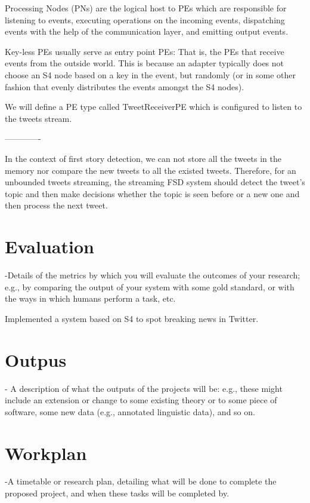 \documentclass[a4paper,12pt]{article}
\begin{document}
Processing Nodes (PNs) are the logical host to PEs which are responsible for listening to events, executing operations on the incoming events, dispatching events with the help of the communication layer, and emitting output events. 

Key-less PEs usually serve as entry point PEs: That is, the PEs that receive events from the outside world. This is because an adapter typically does not choose an S4 node based on a key in the event, but randomly (or in some other fashion that evenly distributes the events amongst the S4 nodes).

We will define a PE type called TweetReceiverPE which is configured to listen to the tweets stream. 



-------------

In the context of first story detection, we can not store all the tweets in the memory nor compare the new tweets to all the existed tweets. Therefore, for an unbounded tweets streaming, the streaming FSD system should detect the tweet's topic and then make decisions whether the topic is seen before or a new one and then process the next tweet. 






\section{Evaluation}

-Details of the metrics by which you will evaluate the outcomes of your research; e.g., by comparing the output of your system with some gold standard, or with the ways in which humans perform a task, etc.


Implemented a system based on S4 to spot breaking news in Twitter.




\section{Outpus}

- A description of what the outputs of the projects will be: e.g., these might include an extension or change to some existing theory or to some piece of software, some new data (e.g., annotated linguistic data), and so on.





\section{Workplan}

-A timetable or research plan, detailing what will be done to complete the proposed project, and when these tasks will be completed by.









\end{document}
